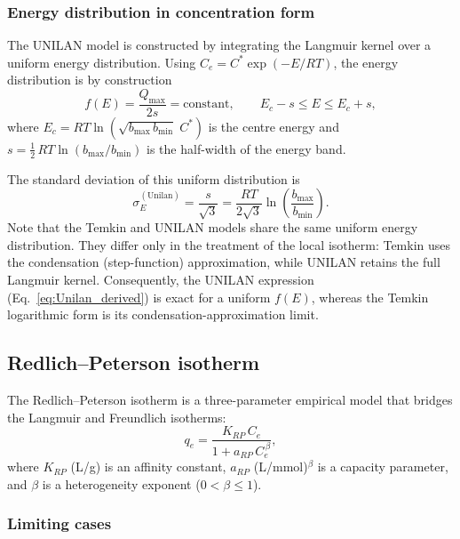 	\subsubsection{Energy distribution in concentration form}

	The UNILAN model is constructed by integrating the Langmuir kernel
	over a uniform energy distribution. Using
	$C_e = C^{\ast}\exp(-E/RT)$, the energy distribution is by
	construction
	\begin{equation}
		f(E) = \frac{Q_{\max}}{2s} = \mathrm{constant},
		\qquad E_c - s \leq E \leq E_c + s,
		\label{eq:fE_unilan}
	\end{equation}
	where $E_c = RT\ln(\sqrt{b_{\max}\,b_{\min}}\; C^{\ast})$ is the
	centre energy and
	$s = \tfrac{1}{2}\,RT\ln(b_{\max}/b_{\min})$ is the half-width of
	the energy band.

	The standard deviation of this uniform distribution is
	\begin{equation}
		\sigma_E^{\mathrm{(Unilan)}}
		= \frac{s}{\sqrt{3}}
		= \frac{RT}{2\sqrt{3}}
		\ln\!\left(\frac{b_{\max}}{b_{\min}}\right).
		\label{eq:sigmaE_unilan}
	\end{equation}
	Note that the Temkin and UNILAN models share the same uniform energy
	distribution. They differ only in the treatment of the local
	isotherm: Temkin uses the condensation (step-function) approximation,
	while UNILAN retains the full Langmuir kernel. Consequently, the
	UNILAN expression (Eq.~\eqref{eq:Unilan_derived}) is exact for a
	uniform $f(E)$, whereas the Temkin logarithmic form is its
	condensation-approximation limit.

	\subsection{Redlich--Peterson isotherm}

	The Redlich--Peterson isotherm is a three-parameter empirical model
	that bridges the Langmuir and Freundlich isotherms:
	\begin{equation}
		q_e = \frac{K_{RP}\, C_e}{1 + a_{RP}\, C_e^{\,\beta}},
		\label{eq:RedlichPeterson}
	\end{equation}
	where $K_{RP}$ (L/g) is an affinity constant, $a_{RP}$
	(L/mmol)$^{\beta}$ is a capacity parameter, and $\beta$ is a
	heterogeneity exponent ($0 < \beta \leq 1$).

	\subsubsection{Limiting cases}


